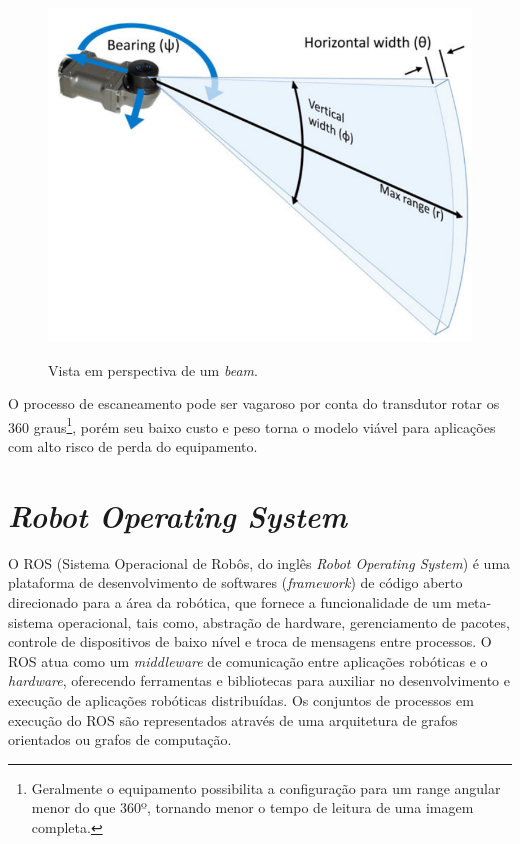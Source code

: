 \begin{figure}[H]
    \centering
    \caption{Vista em perspectiva de um \textit{beam}.}
    \includegraphics[scale=0.3]{dados/figuras/beam.png}
    \label{fig:beam}
\end{figure}

O processo de escaneamento pode ser vagaroso por conta do transdutor rotar os 360 graus\footnote{Geralmente o equipamento possibilita a configuração para um range angular menor do que 360º, tornando menor o tempo de leitura de uma imagem completa.}, porém seu baixo custo e peso torna o modelo viável para aplicações com alto risco de perda do equipamento.


\section{\textit{Robot Operating System}}
\label{sec:ros}

O ROS (Sistema Operacional de Robôs, do inglês \textit{Robot Operating System}) é uma plataforma de desenvolvimento de softwares (\textit{framework}) de código aberto direcionado para a área da robótica, que fornece a funcionalidade de um meta-sistema operacional, tais como, abstração de hardware, gerenciamento de pacotes, controle de dispositivos de baixo nível e troca de mensagens entre processos. 
O ROS atua como um \textit{middleware} de comunicação entre aplicações robóticas e o \textit{hardware}, oferecendo ferramentas e bibliotecas para auxiliar no desenvolvimento e execução de aplicações robóticas distribuídas. Os conjuntos de processos em execução do ROS são representados através de uma arquitetura de grafos orientados ou grafos de computação.


